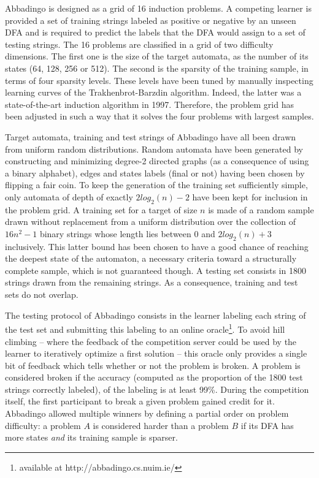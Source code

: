 Abbadingo is designed as a grid of 16 induction problems. A competing learner is provided a set of training strings labeled as positive or negative by an unseen DFA and is required to predict the labels that the DFA would assign to a set of testing strings. The 16 problems are classified in a grid of two difficulty dimensions. The first one is the size of the target automata, as the number of its states (64, 128, 256 or 512). The second is the sparsity of the training sample, in terms of four sparsity levels. These levels have been tuned by manually inspecting learning curves of the Trakhenbrot-Barzdin algorithm. Indeed, the latter was a state-of-the-art induction algorithm in 1997. Therefore, the problem grid has been adjusted in such a way that it solves the four problems with largest samples.

Target automata, training and test strings of Abbadingo have all been drawn from uniform random distributions. Random automata have been generated by constructing and minimizing degree-2 directed graphs (as a consequence of using a binary alphabet), edges and states labels (final or not) having been chosen by flipping a fair coin. To keep the generation of the training set sufficiently simple, only automata of depth of exactly $2log_2(n)-2$ have been kept for inclusion in the problem grid. A training set for a target of size $n$ is made of a random sample drawn without replacement from a uniform distribution over the collection of $16n^2 -1$ binary strings whose length lies between 0 and $2log_2(n)+3$ inclusively. This latter bound has been chosen to have a good chance of reaching the deepest state of the automaton, a necessary criteria toward a structurally complete sample, which is not guaranteed though. A testing set consists in 1800 strings drawn from the remaining strings. As a consequence, training and test sets do not overlap.

The testing protocol of Abbadingo consists in the learner labeling each string of the test set and submitting this labeling to an online oracle\footnote{available at http://abbadingo.cs.nuim.ie/}. To avoid hill climbing -- where the feedback of the competition server could be used by the learner to iteratively optimize a first solution -- this oracle only provides a single bit of feedback which tells whether or not the problem is broken. A problem is considered broken if the accuracy (computed as the proportion of the 1800 test strings correctly labeled), of the labeling is at least 99\%. During the competition itself, the first participant to break a given problem gained credit for it. Abbadingo allowed multiple winners by defining a partial order on problem difficulty: a problem $A$ is considered harder than a problem $B$ if its DFA has more states \emph{and} its training sample is sparser. 

